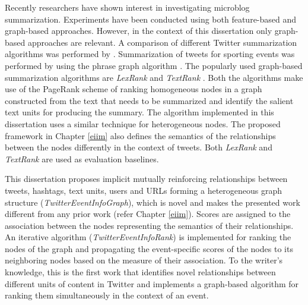Recently researchers have shown interest in investigating microblog summarization. Experiments have been conducted using both feature-based and graph-based approaches. However, in the context of this dissertation only graph-based approaches are relevant. A comparison of different Twitter summarization algorithms was performed by \cite{inouye2011comparing}. Summarization of tweets for sporting events was performed by \cite{nichols2012summarizing} using the phrase graph algorithm \cite{sharifi2010experiments}. The popularly used graph-based summarization algorithms are \textit{LexRank} \cite{erkan2004lexrank} and \textit{TextRank} \cite{mihalcea2004textrank}. Both the algorithms make use of the PageRank scheme of ranking homogeneous nodes in a graph constructed from the text that needs to be summarized and identify the salient text units for producing the summary. The algorithm implemented in this dissertation uses a similar technique for heterogeneous nodes. The proposed framework in Chapter \ref{eiim} also defines the semantics of the relationships between the nodes differently in the context of tweets. Both \textit{LexRank} and \textit{TextRank} are used as evaluation baselines.


This dissertation proposes implicit mutually reinforcing relationships between tweets, hashtags, text units, users and URLs forming a heterogeneous graph structure (\textit{TwitterEventInfoGraph}), which is novel and makes the presented work different from any prior work (refer Chapter \ref{eiim}). Scores are assigned to the association between the nodes representing the semantics of their relationships. An iterative algorithm (\textit{TwitterEventInfoRank}) is implemented for ranking the nodes of the graph and propagating the event-specific scores of the nodes to its neighboring nodes based on the measure of their association. To the writer's knowledge, this is the first work that identifies novel relationships between different units of content in Twitter and implements a graph-based algorithm for ranking them simultaneously in the context of an event.

